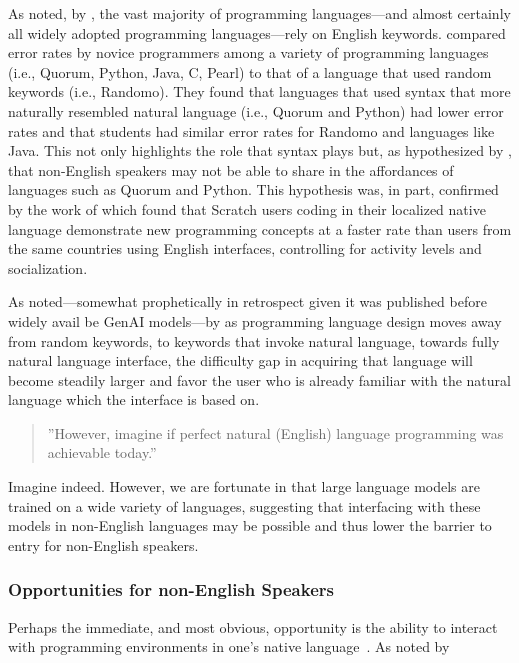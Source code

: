 As noted, by \citet{guo2018non}, the vast majority of programming
languages---and almost certainly all widely adopted programming
languages---rely on English keywords. \citet{stefik2013empirical} compared
error rates by novice programmers among a variety of programming languages
(i.e., Quorum, Python, Java, C, Pearl) to that of a language that used random
keywords (i.e., Randomo). They found that languages that used syntax that more
naturally resembled natural language (i.e., Quorum and Python) had lower error
rates and that students had similar error rates for Randomo and languages like
Java. This not only highlights the role that syntax plays but, as hypothesized
by \citet{becker2019parlez}, that non-English speakers may not be able
to share in the affordances of languages such as Quorum and Python. This
hypothesis was, in part, confirmed by the work of \citet{dasgupta2017learning}
which found that Scratch users coding in their localized native language
demonstrate new programming concepts at a faster rate than users from the same
countries using English interfaces, controlling for activity levels and
socialization. 


As noted---somewhat prophetically in retrospect given it was published before
widely avail be GenAI models---by \citet{becker2019parlez} as programming
language design moves away from random keywords, to keywords that invoke
natural language, towards fully natural language interface, the difficulty gap
in acquiring that language will become steadily larger and favor the user who is
already familiar with the natural language which the interface is based on. 
\begin{quote}
   ''However, imagine if perfect natural (English) language programming was
   achievable today.''
\end{quote}
Imagine indeed. However, we are fortunate in that large language models are
trained on a wide variety of languages, suggesting that interfacing with these
models in non-English languages may be possible and thus lower the barrier to 
entry for non-English speakers.


\subsubsection{Opportunities for non-English Speakers}

Perhaps the immediate, and most obvious, opportunity is the ability to interact
with programming environments in one's native language~\cite{smith2024explain, prather2025breaking}.
As noted by 



